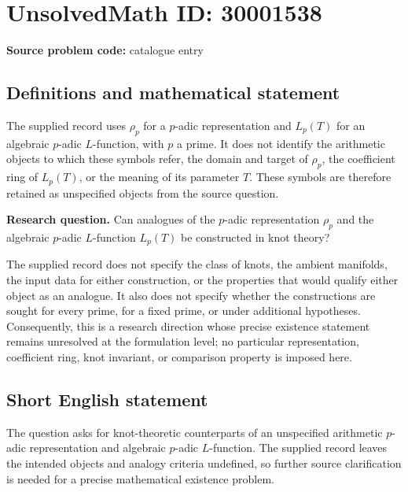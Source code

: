 \documentclass[11pt]{article}
\begin{document}
\section*{UnsolvedMath ID: 30001538}
\textbf{Source problem code:} catalogue entry
\subsection{Definitions and mathematical statement}
The supplied record uses \(\rho_p\) for a \(p\)-adic representation and \(L_p(T)\) for an algebraic \(p\)-adic \(L\)-function, with \(p\) a prime. It does not identify the arithmetic objects to which these symbols refer, the domain and target of \(\rho_p\), the coefficient ring of \(L_p(T)\), or the meaning of its parameter \(T\). These symbols are therefore retained as unspecified objects from the source question.

\textbf{Research question.} Can analogues of the \(p\)-adic representation \(\rho_p\) and the algebraic \(p\)-adic \(L\)-function \(L_p(T)\) be constructed in knot theory?

The supplied record does not specify the class of knots, the ambient manifolds, the input data for either construction, or the properties that would qualify either object as an analogue. It also does not specify whether the constructions are sought for every prime, for a fixed prime, or under additional hypotheses. Consequently, this is a research direction whose precise existence statement remains unresolved at the formulation level; no particular representation, coefficient ring, knot invariant, or comparison property is imposed here.
\subsection{Short English statement}
The question asks for knot-theoretic counterparts of an unspecified arithmetic \(p\)-adic representation and algebraic \(p\)-adic \(L\)-function. The supplied record leaves the intended objects and analogy criteria undefined, so further source clarification is needed for a precise mathematical existence problem.
\end{document}

